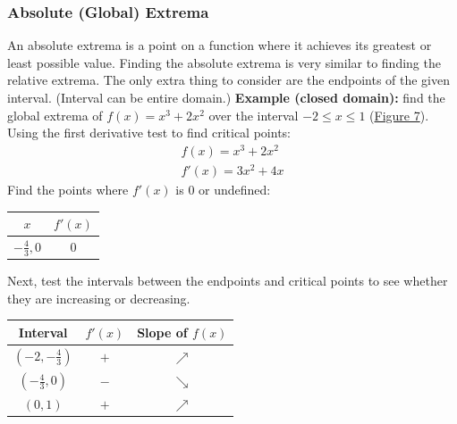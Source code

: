\documentclass[12pt]{article}
\begin{document}
            \subsubsection{Absolute (Global) Extrema}
                An absolute extrema is a point on a function where it achieves its greatest or least possible value. Finding the absolute extrema is very similar to finding the relative extrema. The only extra thing to consider are the endpoints of the given interval. (Interval can be entire domain.)
                \newline \newline
                \textbf{Example (closed domain):} find the global extrema of $f(x) = x^3+2x^2$ over the interval $-2 \le x \le 1$ (\hyperref[fig:absextremaclosed]{Figure 7}).
                \\ Using the first derivative test to find critical points:
                \begin{gather*}
                    f(x) = x^3 + 2x^2 \\
                    f'(x) = 3x^2 + 4x
                \end{gather*}
                Find the points where $f'(x)$ is $0$ or undefined:
                \begin{center}
                    \begin{tabular}{|c|c|}
                        \hline
                        $x$ & $f'(x)$ \\
                        \hline \hline
                        $-\frac{4}{3}, 0$ & $0$ \\
                        \hline
                    \end{tabular}
                \end{center}
                Next, test the intervals between the endpoints and critical points to see whether they are increasing or decreasing.
                \begin{center}
                    \begin{tabular}{|c|c|c|}
                        \hline
                        Interval & $f'(x)$ & Slope of $f(x)$ \\
                        \hline \hline
                        $(-2, -\frac{4}{3})$ & $+$ & $\nearrow$ \\
                        \hline
                        $(-\frac{4}{3}, 0)$ & $-$ & $\searrow$ \\
                        \hline
                        $(0, 1)$ & $+$ & $\nearrow$ \\
                        \hline
                    \end{tabular}
                \end{center}
\end{document}
